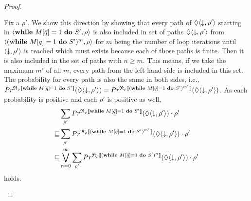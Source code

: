 \documentclass[a4paper,UKenglish,cleveref, autoref, thm-restate]{lipics-v2021}
\begin{document}
\begin{proof}
\begin{enumerate}
\begin{itemize}
\begin{enumerate}
        Fix a $\rho'$. We show this direction by showing that every path of $\lozenge \langle \downarrow , \rho' \rangle$ starting in $\langle \mathbf{while } \text{ }M[\Bar{q}]=1 \text{ }\mathbf{ do } \text{ }S' , \rho \rangle$ is also included in set of paths $\lozenge \langle \downarrow , \rho' \rangle$ from $\langle (\mathbf{while } \text{ }M[\Bar{q}]=1 \text{ }\mathbf{ do } \text{ }S')^m , \rho \rangle$ for $m$ being the number of loop iterations until $\langle \downarrow , \rho' \rangle$ is reached which must exists because each of those paths is finite. Then it is also included in the set of paths with $n\geq m$. This means, if we take the maximum $m'$ of all $m$, every path from the left-hand side is included in this set. The probability for every path is also the same in both sides, i.e., $Pr^{\mathfrak{R}_{\rho}\llbracket \mathbf{while } \text{ }M[\Bar{q}]=1 \text{ }\mathbf{ do } \text{ }S' \rrbracket}(\lozenge \langle \downarrow , \rho' \rangle)=  Pr^{\mathfrak{R}_{\rho}\llbracket (\mathbf{while } \text{ }M[\Bar{q}]=1 \text{ }\mathbf{ do } \text{ }S')^{m'} \rrbracket}(\lozenge \langle \downarrow , \rho' \rangle) $.
        As each probability is positive and each $\rho'$ is positive as well,
        \begin{align*}
            &\sum_{\rho'} Pr^{\mathfrak{R}_{\rho}\llbracket \mathbf{while } \text{ }M[\Bar{q}]=1 \text{ }\mathbf{ do } \text{ }S' \rrbracket}(\lozenge \langle \downarrow , \rho' \rangle) \cdot \rho' \\
            \sqsubseteq& \sum_{\rho'} Pr^{\mathfrak{R}_{\rho}\llbracket (\mathbf{while } \text{ }M[\Bar{q}]=1 \text{ }\mathbf{ do } \text{ }S')^{m'} \rrbracket}(\lozenge \langle \downarrow , \rho' \rangle) \cdot \rho'\\
            \sqsubseteq &  \bigvee_{n=0}^\infty \sum_{\rho'} Pr^{\mathfrak{R}_{\rho}\llbracket (\mathbf{while } \text{ }M[\Bar{q}]=1 \text{ }\mathbf{ do } \text{ }S')^n \rrbracket}(\lozenge \langle \downarrow , \rho' \rangle) \cdot \rho'
        \end{align*} holds.



\end{enumerate}
\end{itemize}
\end{enumerate}
\end{proof}
\end{document}
